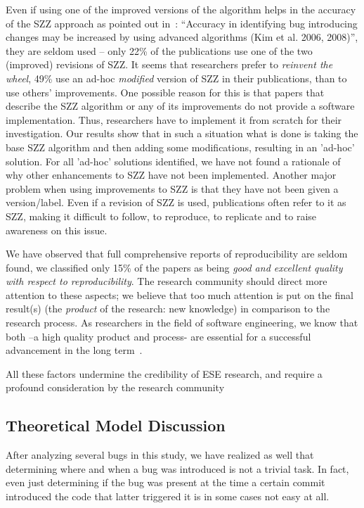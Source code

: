 \documentclass[a4paper, 12pt]{book}
\begin{document}
Even if using one of the improved versions of the algorithm helps in the accuracy of the SZZ approach as pointed out in~\cite{rahman2012clones}: ``Accuracy in identifying bug introducing changes may be increased by using advanced algorithms (Kim et al. 2006, 2008)'', they are seldom used -- only 22\% of the publications use one of the two (improved) revisions of SZZ. It seems that researchers prefer to \emph{reinvent the wheel}, 49\% use an ad-hoc \emph{modified} version of SZZ in their publications, than to use others' improvements. One possible reason for this is that papers that describe the SZZ algorithm or any of its improvements do not provide a software implementation. Thus, researchers have to implement it from scratch for their investigation. Our results show that in such a situation what is done is taking the base SZZ algorithm and then adding some modifications, resulting in an 'ad-hoc' solution. For all 'ad-hoc' solutions identified, we have not found a rationale of why other enhancements to SZZ have not been implemented. Another major problem when using improvements to SZZ is that they have not been given a version/label. Even if a revision of SZZ is used, publications often refer to it as SZZ, making it difficult to follow, to reproduce, to replicate and to raise awareness on this issue.

We have observed that full comprehensive reports of reproducibility are seldom found, we classified only 15\% of the papers as being \emph{good and excellent quality with respect to reproducibility}. The research community should direct more attention to these aspects; we believe that too much attention is put on the final result(s) (the \emph{product} of the research: new knowledge) in comparison to the research process. As researchers in the field of software engineering, we know that both --a high quality product and process- are essential for a successful advancement in the long term~\cite{kan2002metrics}.

All these factors undermine the credibility of ESE research, and require a profound consideration  by the research community

\subsection{Theoretical Model Discussion}
\label{subsec:implicationsModel}
After analyzing several bugs in this study, we have realized as well that determining where and when a bug was introduced is not a trivial task. In fact, even just determining if the bug was present at the time a certain commit introduced the code that latter triggered it is in some cases not easy at all.
\end{document}
